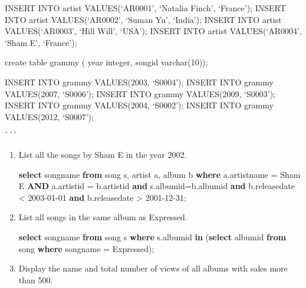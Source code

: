 \documentclass[
]{article}
\newenvironment{Shaded}{}{}
\newcommand{\KeywordTok}[1]{\textcolor[rgb]{0.00,0.44,0.13}{\textbf{#1}}}
\newcommand{\NormalTok}[1]{#1}
\newcommand{\OperatorTok}[1]{\textcolor[rgb]{0.40,0.40,0.40}{#1}}
\newcommand{\StringTok}[1]{\textcolor[rgb]{0.25,0.44,0.63}{#1}}
\begin{document}
INSERT INTO artist VALUES(`AR0001', `Natalia Finch', `France'); INSERT
INTO artist VALUES(`AR0002', `Suman Yu', `India'); INSERT INTO artist
VALUES(`AR0003', `Hill Will', `USA'); INSERT INTO artist
VALUES(`AR0004', `Sham E', `France');

create table grammy ( year integer, songid varchar(10));

INSERT INTO grammy VALUES(2003, `S0004'); INSERT INTO grammy
VALUES(2007, `S0006'); INSERT INTO grammy VALUES(2009, `S0003'); INSERT
INTO grammy VALUES(2004, `S0002'); INSERT INTO grammy VALUES(2012,
`S0007');

\begin{verbatim}
```
\end{verbatim}

\begin{enumerate}
\def\labelenumi{\arabic{enumi}.}
\setcounter{enumi}{1}
\item
  List all the songs by Sham E in the year 2002.

\begin{Shaded}
\begin{Highlighting}[]
\KeywordTok{select}\NormalTok{ songname }\KeywordTok{from}\NormalTok{ song s, artist a, album b }\KeywordTok{where}\NormalTok{ a.artistname }\OperatorTok{=} \StringTok{\textquotesingle{}Sham E\textquotesingle{}} \KeywordTok{AND}\NormalTok{ a.artistid }\OperatorTok{=}\NormalTok{ b.artistid }\KeywordTok{and}\NormalTok{ s.albumid}\OperatorTok{=}\NormalTok{b.albumid }\KeywordTok{and}\NormalTok{ b.releasedate }\OperatorTok{<} \StringTok{\textquotesingle{}2003{-}01{-}01\textquotesingle{}} \KeywordTok{and}\NormalTok{ b.releasedate }\OperatorTok{>} \StringTok{\textquotesingle{}2001{-}12{-}31\textquotesingle{}}\NormalTok{;}
\end{Highlighting}
\end{Shaded}
\item
  List all songs in the same album as Expressed.

\begin{Shaded}
\begin{Highlighting}[]
\KeywordTok{select}\NormalTok{ songname }\KeywordTok{from}\NormalTok{ song s }\KeywordTok{where}\NormalTok{ s.albumid }\KeywordTok{in}\NormalTok{ (}\KeywordTok{select}\NormalTok{ albumid }\KeywordTok{from}\NormalTok{ song }\KeywordTok{where}\NormalTok{ songname }\OperatorTok{=} \StringTok{\textquotesingle{}Expressed\textquotesingle{}}\NormalTok{);}
\end{Highlighting}
\end{Shaded}
\item
  Display the name and total number of views of all albums with sales
  more than 500.


\end{enumerate}
\end{document}
